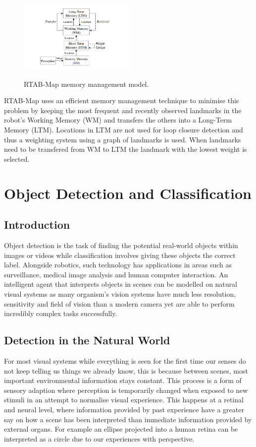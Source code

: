 \documentclass{mproj}
\begin{document}
\begin{figure}[h]
  \caption{RTAB-Map memory management model.}
  \centering
  \includegraphics[width=0.5\textwidth]{images/memory.png}
  \label{fig:RTABMap Memory diagram}
\end{figure}

RTAB-Map uses an efficient memory management technique to minimise this problem by keeping the most frequent and recently observed landmarks in the robot's Working Memory (WM) and transfers the others into a Long-Term Memory (LTM). \cite{labbe13appearance} Locations in LTM are not used for loop closure detection and thus a weighting system using a graph of landmarks is used. When  landmarks need to be transfered from  WM to LTM the landmark with the lowest weight is selected. 


\section{Object Detection and Classification}

\subsection{Introduction}
Object detection is the task of finding the potential real-world objects within images or videos while classification involves giving these objects the correct label. Alongside robotics, such technology has applications in areas such as surveillance, medical image analysis and human computer interaction. An intelligent agent that interprets objects in scenes can be modelled on natural visual systems as many organism's vision systems have much less resolution, sensitivity and field of vision than a modern camera yet are able to perform incredibly complex tasks successfully. 

\subsection{Detection in the Natural World}

For most visual systems while everything is seen for the first time our senses do not keep telling us things we already know, this is because between scenes, most important environmental information stays constant. This process is a form of sensory adaption where perception is temporarily changed when exposed to new stimuli in an attempt to normalise visual experience.\cite{Webster2015} This happens at a retinal and neural level, where information provided by past experience have a greater say on how a scene has been interpreted than immediate information provided by external organs. For example an ellipse projected into a human retina can be interpreted as a circle due to our experiences with perspective\cite{eyebrain}.
\end{document}
